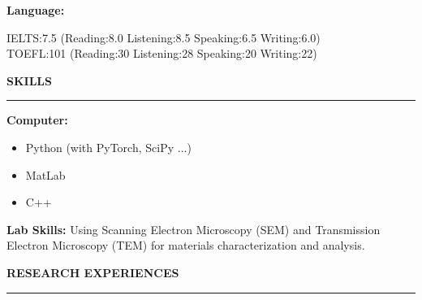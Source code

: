 \documentclass[10pt]{article}
\newcommand{\cvsection}[1]{%
    \vspace{8pt}%
    \noindent\textbf{\Large #1}\\[-0.5\baselineskip]%
    \rule{\linewidth}{0.4pt}%
    \vspace{0.5\baselineskip}%
}
\newenvironment{cvsubsectionblock}[1]{%
    \noindent \textbf{#1:}\\%
    \begin{list}{}{\setlength{\leftmargin}{0.5cm}\setlength{\itemsep}{0pt}\setlength{\parsep}{0pt}\setlength{\topsep}{0pt}\setlength{\partopsep}{0pt}}%
    \item\relax %
    \vspace{-\baselineskip}%
}{\end{list}}
\begin{document}
\begin{cvsubsectionblock}{Language}
    IELTS:7.5 (Reading:8.0 Listening:8.5 Speaking:6.5 Writing:6.0)\\
    TOEFL:101 (Reading:30 Listening:28 Speaking:20 Writing:22)
\end{cvsubsectionblock}\vspace{10pt}

\cvsection{SKILLS}

\begin{cvsubsectionblock}{Computer}
    \begin{itemize} %
        \item Python (with PyTorch, SciPy ...)
        \item MatLab
        \item C++
    \end{itemize}
\end{cvsubsectionblock}
\vspace{-0.5\baselineskip} %
\noindent \textbf{Lab Skills:} Using Scanning Electron Microscopy (SEM) and Transmission Electron Microscopy (TEM) for materials characterization and analysis.\vspace{10pt}

\cvsection{RESEARCH EXPERIENCES}
\end{document}
